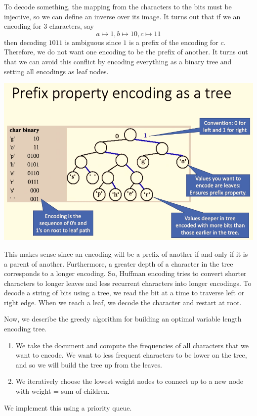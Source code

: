 \documentclass{article}
\begin{document}
    To decode something, the mapping from the characters to the bits must be injective, so we can define an inverse over its image. It turns out that if we an encoding for 3 characters, say 
    \[a \mapsto 1, b \mapsto 10, c \mapsto 11\]
    then decoding $1011$ is ambiguous since $1$ is a prefix of the encoding for $c$. Therefore, we do not want one encoding to be the prefix of another. It turns out that we can avoid this conflict by encoding everything as a binary tree and setting all encodings as leaf nodes. 
    \begin{center}
        \includegraphics[scale=0.5]{img/Tree_Encoding.png}
    \end{center}
    This makes sense since an encoding will be a prefix of another if and only if it is a parent of another. Furthermore, a greater depth of a character in the tree corresponds to a longer encoding. So, Huffman encoding tries to convert shorter characters to longer leaves and less recurrent characters into longer encodings. To decode a string of bits using a tree, we read the bit at a time to traverse left or right edge. When we reach a leaf, we decode the character and restart at root. 

    Now, we describe the greedy algorithm for building an optimal variable length encoding tree. 
    \begin{enumerate}
        \item We take the document and compute the frequencies of all characters that we want to encode. We want to less frequent characters to be lower on the tree, and so we will build the tree up from the leaves. 
        \item We iteratively choose the lowest weight nodes to connect up to a new node with weight = sum of children. 
    \end{enumerate}
    We implement this using a priority queue. 
\end{document}
